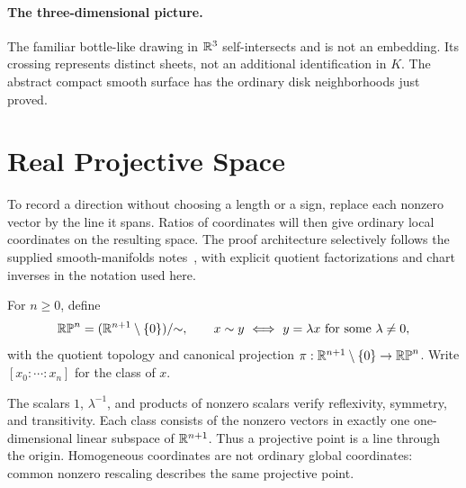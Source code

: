 \paragraph{The three-dimensional picture.}
The familiar bottle-like drawing in $\mathbb{R}^3$ self-intersects and is not an
embedding. Its crossing represents distinct sheets, not an additional
identification in $K$. The abstract compact smooth surface has the ordinary
disk neighborhoods just proved.


\section{Real Projective Space}\label{sec:projective-space}
To record a direction without choosing a length or a sign, replace each
nonzero vector by the line it spans. Ratios of coordinates will then give
ordinary local coordinates on the resulting space.
The proof architecture selectively follows the supplied smooth-manifolds
notes~\cite{xuewang-manifold-notes}, with explicit quotient factorizations
and chart inverses in the notation used here.
\begin{definition}
For $n\geq0$, define
\[
\mathbb{RP}^n=(\mathbb{R}^{n+1}\setminus\{0\})/{\sim},\qquad
x\sim y\ \Longleftrightarrow\ y=\lambda x\text{ for some }\lambda\ne0,
\]
with the quotient topology and canonical projection
$\pi:\mathbb{R}^{n+1}\setminus\{0\}\to\mathbb{RP}^n$.
Write $[x_0:\cdots:x_n]$ for the class of $x$.
\end{definition}
The scalars $1$, $\lambda^{-1}$, and products of nonzero scalars verify
reflexivity, symmetry, and transitivity. Each class consists of the nonzero
vectors in exactly one one-dimensional linear subspace of $\mathbb{R}^{n+1}$.
Thus a projective point is a line through the origin.
Homogeneous coordinates are not ordinary global coordinates: common
nonzero rescaling describes the same projective point.

